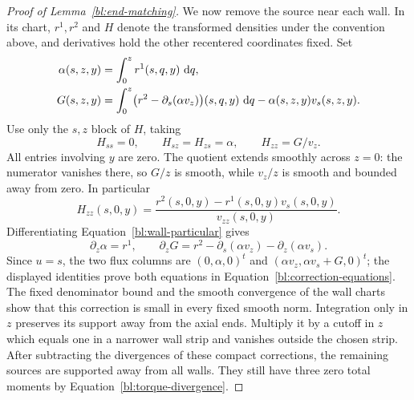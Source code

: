\begin{proof}[Proof of Lemma~\ref{bl:end-matching}]
We now remove the source near each wall.  In its chart, $r^1,r^2$ and
$H$ denote the transformed densities under the convention above, and
derivatives hold the other recentered coordinates fixed.  Set
\begin{align}
 \alpha(s,z,y)&=\int_0^z r^1(s,q,y)\,\,\mathrm d q,\notag\\
 G(s,z,y)&=\int_0^z
       \bigl(r^2-\partial_s(\alpha v_z)\bigr)(s,q,y)\,\,\mathrm d q
           -\alpha(s,z,y)v_s(s,z,y).\label{bl:wall-particular}
\end{align}
Use only the $s,z$ block of $H$, taking
\[
 H_{ss}=0,\qquad H_{sz}=H_{zs}=\alpha,\qquad H_{zz}=G/v_z.
\]
All entries involving $y$ are zero.  The quotient extends smoothly
across $z=0$: the numerator vanishes there, so $G/z$ is smooth, while
$v_z/z$ is smooth and bounded away from zero.  In particular
\[
 H_{zz}(s,0,y)=
 \frac{r^2(s,0,y)-r^1(s,0,y)v_s(s,0,y)}{v_{zz}(s,0,y)}.
\]
Differentiating Equation~\eqref{bl:wall-particular} gives
\[
 \partial_z\alpha=r^1,\qquad
 \partial_zG=r^2-\partial_s(\alpha v_z)-\partial_z(\alpha v_s).
\]
Since $u=s$, the two flux columns are
$(0,\alpha,0)^t$ and $(\alpha v_z,\alpha v_s+G,0)^t$; the displayed
identities prove both equations in Equation~\eqref{bl:correction-equations}.
The fixed denominator bound and the smooth convergence of the wall
charts show that this correction is small in every fixed smooth norm.
Integration only in $z$ preserves its support away from the axial ends.
Multiply it by a cutoff in $z$ which equals one in a narrower wall
strip and vanishes outside the chosen
strip.  After subtracting the divergences of these compact corrections,
the remaining sources are supported away from all walls.  They still
have three zero total moments by Equation~\eqref{bl:torque-divergence}.


\end{proof}
